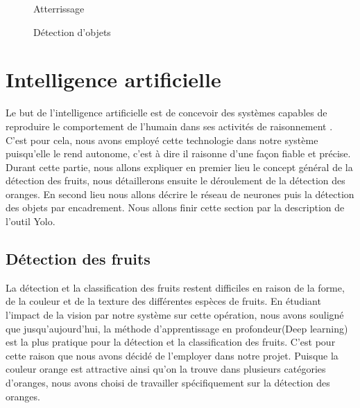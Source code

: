 \begin{figure}[H]
\begin{minipage}{0.49\textwidth}
	\caption{Atterrissage }
	
\end{minipage}
\begin{minipage}{0.49\textwidth}
	\caption{Détection d'objets }
	
\end{minipage}
\end{figure}
\section{Intelligence artificielle}
Le but de l'intelligence artificielle est de concevoir des systèmes capables de reproduire le comportement de l'humain dans ses activités de raisonnement \cite{PowerPoint}. C'est pour cela, nous avons employé cette technologie dans notre système puisqu'elle le rend autonome, c'est à dire il raisonne d'une façon fiable et précise. 
Durant cette partie, nous allons expliquer en premier lieu le concept général de la détection des fruits, nous détaillerons ensuite le déroulement de la détection des oranges. En second lieu nous allons décrire le réseau de neurones puis la détection des objets par encadrement. Nous allons finir cette section par la description de l'outil Yolo. 

\subsection{Détection des fruits}
La détection et la classification des fruits restent difficiles en raison de la forme, de la couleur et de la texture des différentes espèces de fruits. En étudiant l'impact de la vision par notre système sur cette opération, nous avons souligné que jusqu'aujourd'hui, la méthode d'apprentissage en profondeur(Deep learning) est la plus pratique pour la détection et la classification des fruits. C'est pour cette raison que nous avons décidé de l'employer dans notre projet. Puisque la couleur orange est attractive ainsi qu'on la trouve dans plusieurs catégories d'oranges, nous avons choisi de travailler spécifiquement sur la détection des oranges.
